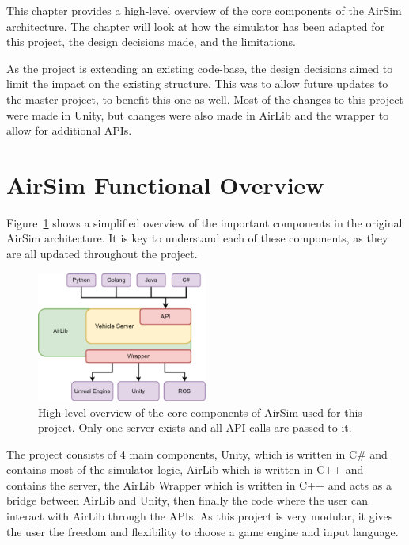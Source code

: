 This chapter provides a high-level overview of the core components of the AirSim architecture. The chapter will look at how the simulator has been adapted for this project, the design decisions made, and the limitations. 

As the project is extending an existing code-base, the design decisions aimed to limit the impact on the existing structure. This was to allow future updates to the master project, to benefit this one as well. Most of the changes to this project were made in Unity, but changes were also made in AirLib and the wrapper to allow for additional APIs. 

\section{AirSim Functional Overview} \label{05:Overview}
Figure~\ref{ADA:Figure:OriginalOverview} shows a simplified overview of the important components in the original AirSim architecture. It is key to understand each of these components, as they are all updated throughout the project. 

\begin{figure}[h]
    \centering
    \includegraphics[width=0.5\textwidth]{05_AnalysisAndDesign/Diagrams/OriginalOverview.png}
    \caption{High-level overview of the core components of AirSim used for this project. Only one server exists and all API calls are passed to it.}
    \label{ADA:Figure:OriginalOverview}
\end{figure}

The project consists of 4 main components, Unity, which is written in C\# and contains most of the simulator logic, AirLib which is written in C++ and contains the server, the AirLib Wrapper which is written in C++ and acts as a bridge between AirLib and Unity, then finally the code where the user can interact with AirLib through the APIs. As this project is very modular, it gives the user the freedom and flexibility to choose a game engine and input language. 


